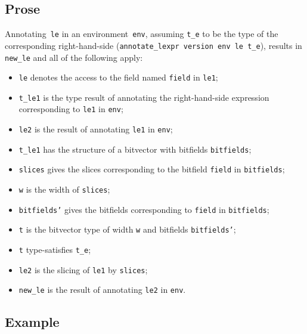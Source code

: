 \documentclass{book}
\begin{document}
\begin{itemize}
    \subsection{Prose}
   Annotating~\texttt{le} in an environment~\texttt{env}, assuming
\texttt{t\_e} to be the type of the corresponding right-hand-side
(\texttt{annotate\_lexpr version env le t\_e}), results in \texttt{new\_le} and
all of the following apply:
   \begin{itemize}
   \item \texttt{le} denotes the access to the field named \texttt{field} in \texttt{le1};
   \item \texttt{t\_le1} is the type result of annotating the right-hand-side expression corresponding to \texttt{le1} in \texttt{env};
   \item \texttt{le2} is the result of annotating \texttt{le1} in \texttt{env};
   \item \texttt{t\_le1} has the structure of a bitvector with bitfields \texttt{bitfields};
   \item \texttt{slices} gives the slices corresponding to the bitfield \texttt{field} in
      \texttt{bitfields};
   \item \texttt{w} is the width of \texttt{slices};
   \item \texttt{bitfields'} gives the bitfields corresponding to \texttt{field} in \texttt{bitfields};
   \item \texttt{t} is the bitvector type of width \texttt{w} and bitfields \texttt{bitfields'};
   \item \texttt{t} type-satisfies \texttt{t\_e};
   \item \texttt{le2} is the slicing of \texttt{le1} by \texttt{slices};
   \item \texttt{new\_le} is the result of annotating \texttt{le2} in \texttt{env}.
   \end{itemize}

  \subsection{Example}



\begin{emptyformal}

\end{emptyformal}
\end{itemize}
\end{document}
